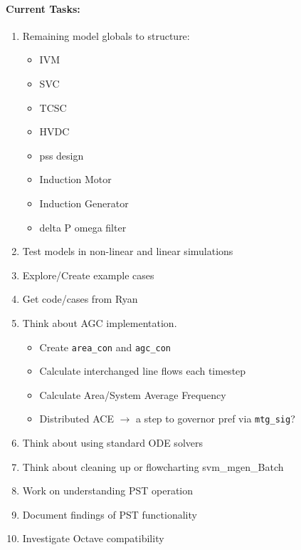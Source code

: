 \documentclass[12pt]{article}
\begin{document}
\begin{multicols}{2}
\paragraph{Current Tasks:}
	\begin{enumerate}
		\itemsep 0em 
		\item Remaining model globals to structure:
		\begin{minipage}{\linewidth}
				\begin{multicols}{2}
						\begin{itemize}
				\itemsep0em 
						\footnotesize
							\item IVM
							\item SVC
							\item TCSC
							\item HVDC
							\item pss design
							\item Induction Motor
							\item Induction Generator
							\item delta P omega filter
						\end{itemize}
				\end{multicols}
				\end{minipage}
		\item Test models in non-linear and linear simulations
		\item Explore/Create example cases
		\item Get code/cases from Ryan
		\item Think about AGC implementation.
		\begin{minipage}{\linewidth}
						\begin{itemize}
				\itemsep0em 
						\footnotesize
				\item Create \verb|area_con| and \verb|agc_con|
				\item Calculate interchanged line flows each timestep
				\item Calculate Area/System Average Frequency
				\item Distributed ACE $\longrightarrow$ a step to governor pref via \verb|mtg_sig|?
							
						\end{itemize}
				\end{minipage}
		\item Think about using standard ODE solvers
		\item Think about cleaning up or flowcharting svm\_mgen\_Batch
		\item Work on understanding PST operation
		\item Document findings of PST functionality
		\item Investigate Octave compatibility
\end{enumerate}




\end{multicols}
\end{document}
